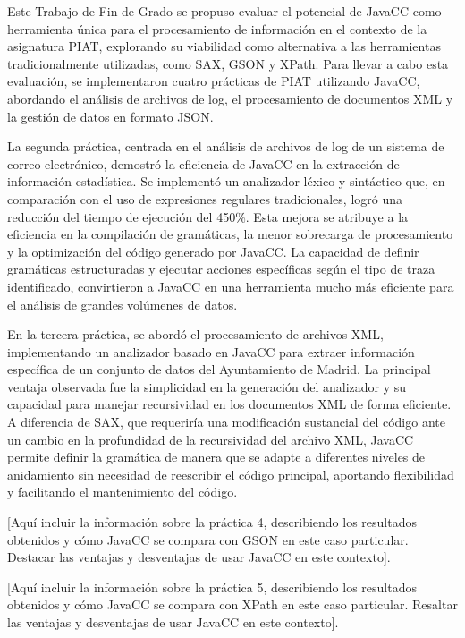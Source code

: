 \noindent Este Trabajo de Fin de Grado se propuso evaluar el potencial de JavaCC como herramienta única para el procesamiento de información en el contexto de la asignatura PIAT, explorando su viabilidad como alternativa a las herramientas tradicionalmente utilizadas, como SAX, GSON y XPath. Para llevar a cabo esta evaluación, se implementaron cuatro prácticas de PIAT utilizando JavaCC, abordando el análisis de archivos de log, el procesamiento de documentos XML y la gestión de datos en formato JSON.

La segunda práctica, centrada en el análisis de archivos de log de un sistema de correo electrónico, demostró la eficiencia de JavaCC en la extracción de información estadística. Se implementó un analizador léxico y sintáctico que, en comparación con el uso de expresiones regulares tradicionales, logró una reducción del tiempo de ejecución del 450\%. Esta mejora se atribuye a la eficiencia en la compilación de gramáticas, la menor sobrecarga de procesamiento y la optimización del código generado por JavaCC. La capacidad de definir gramáticas estructuradas y ejecutar acciones específicas según el tipo de traza identificado, convirtieron a JavaCC en una herramienta mucho más eficiente para el análisis de grandes volúmenes de datos.

En la tercera práctica, se abordó el procesamiento de archivos XML, implementando un analizador basado en JavaCC para extraer información específica de un conjunto de datos del Ayuntamiento de Madrid. La principal ventaja observada fue la simplicidad en la generación del analizador y su capacidad para manejar recursividad en los documentos XML de forma eficiente. A diferencia de SAX, que requeriría una modificación sustancial del código ante un cambio en la profundidad de la recursividad del archivo XML, JavaCC permite definir la gramática de manera que se adapte a diferentes niveles de anidamiento sin necesidad de reescribir el código principal, aportando flexibilidad y facilitando el mantenimiento del código.

[Aquí incluir la información sobre la práctica 4, describiendo los resultados obtenidos y cómo JavaCC se compara con GSON en este caso particular. Destacar las ventajas y desventajas de usar JavaCC en este contexto].

[Aquí incluir la información sobre la práctica 5, describiendo los resultados obtenidos y cómo JavaCC se compara con XPath en este caso particular. Resaltar las ventajas y desventajas de usar JavaCC en este contexto].

